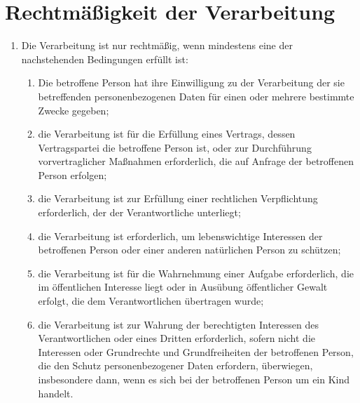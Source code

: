 \chapter{Rechtmäßigkeit der Verarbeitung}
\label{ch:06}


\begin{enumerate}

  \item Die Verarbeitung ist nur rechtmäßig, wenn mindestens eine der nachstehenden Bedingungen erfüllt ist:
  \label{itm:06-1}

  \begin{enumerate}
  
    \item Die betroffene Person hat ihre Einwilligung zu der Verarbeitung der sie betreffenden personenbezogenen Daten
     für einen oder mehrere bestimmte Zwecke gegeben;
    \label{itm:06-1a}

    \item die Verarbeitung ist für die Erfüllung eines Vertrags, dessen Vertragspartei die betroffene Person ist, oder
     zur Durchführung vorvertraglicher Maßnahmen erforderlich, die auf Anfrage der betroffenen Person erfolgen;
    \label{itm:06-1b}

    \item die Verarbeitung ist zur Erfüllung einer rechtlichen Verpflichtung erforderlich, der der Verantwortliche
     unterliegt;
    \label{itm:06-1c}

    \item die Verarbeitung ist erforderlich, um lebenswichtige Interessen der betroffenen Person oder einer anderen
     natürlichen Person zu schützen;
    \label{itm:06-1d}

    \item die Verarbeitung ist für die Wahrnehmung einer Aufgabe erforderlich, die im öffentlichen Interesse liegt oder
     in Ausübung öffentlicher Gewalt erfolgt, die dem Verantwortlichen übertragen wurde;
    \label{itm:06-1e}

    \item die Verarbeitung ist zur Wahrung der berechtigten Interessen des Verantwortlichen oder eines Dritten
     erforderlich, sofern nicht die Interessen oder Grundrechte und Grundfreiheiten der betroffenen Person, die den
     Schutz personenbezogener Daten erfordern, überwiegen, insbesondere dann, wenn es sich bei der betroffenen Person
     um ein Kind handelt.
    \label{itm:06-1f}


\end{enumerate}
\end{enumerate}
